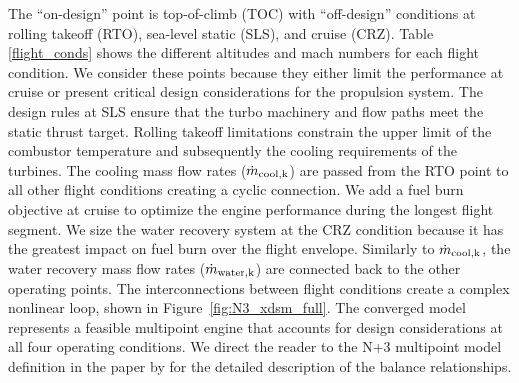\documentclass[conf]{new-aiaa}
\begin{document}
The ``on-design'' point is top-of-climb (TOC) with ``off-design'' conditions at rolling takeoff (RTO), sea-level static (SLS), and cruise (CRZ).
Table \ref{flight_conds} shows the different altitudes and mach numbers for each flight condition.
We consider these points because they either limit the performance at cruise or present critical design considerations for the propulsion system.
The design rules at SLS ensure that the turbo machinery and flow paths meet the static thrust target.
Rolling takeoff limitations constrain the upper limit of the combustor temperature and subsequently the cooling requirements of the turbines.
The cooling mass flow rates ($\dot{m}_{\rm{cool},k}$) are passed from the RTO point to all other flight conditions creating a cyclic connection.
We add a fuel burn objective at cruise to optimize the engine performance during the longest flight segment.
We size the water recovery system at the CRZ condition because it has the greatest impact on fuel burn over the flight envelope.
Similarly to $\dot{m}_{\rm{cool},k}$, the water recovery mass flow rates ($\dot{m}_{\rm{water},k}$) are connected back to the other operating points.
The interconnections between flight conditions create a complex nonlinear loop, shown in Figure~\ref{fig:N3_xdsm_full}.
The converged model represents a feasible multipoint engine that accounts for design considerations at all four operating conditions.
We direct the reader to the N+3 multipoint model definition in the paper by \citet{Hendricks2019} for the detailed description of the balance relationships.
\end{document}
